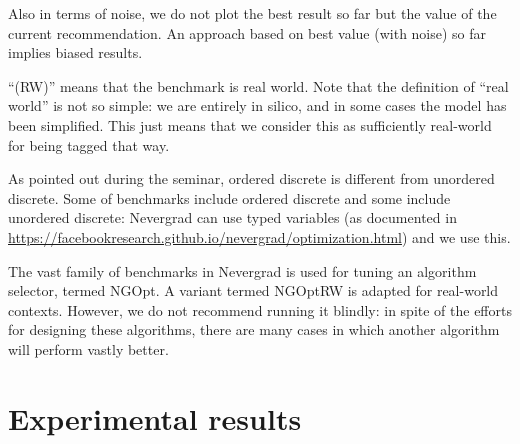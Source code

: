\documentclass{article}
\begin{document}
Also in terms of noise, we do not plot the best result so far but the value of the current recommendation. An approach based on best value (with noise) so far implies biased results.

``(RW)'' means that the benchmark is real world. Note that the definition of ``real world'' is not so simple: we are entirely in silico, and in some cases the model has been simplified. This just means that we consider this as sufficiently real-world for being tagged that way.

As pointed out during the seminar, ordered discrete is different from unordered discrete. Some of benchmarks include ordered discrete and some include unordered discrete: Nevergrad can use typed variables (as documented in \url{https://facebookresearch.github.io/nevergrad/optimization.html}) and we use this.

The vast family of benchmarks in Nevergrad is used for tuning an algorithm selector, termed NGOpt. A variant termed NGOptRW is adapted for real-world contexts. However, we do not recommend running it blindly: in spite of the efforts for designing these algorithms, there are many cases in which another algorithm will perform vastly better.

\section{Experimental results}
\end{document}
